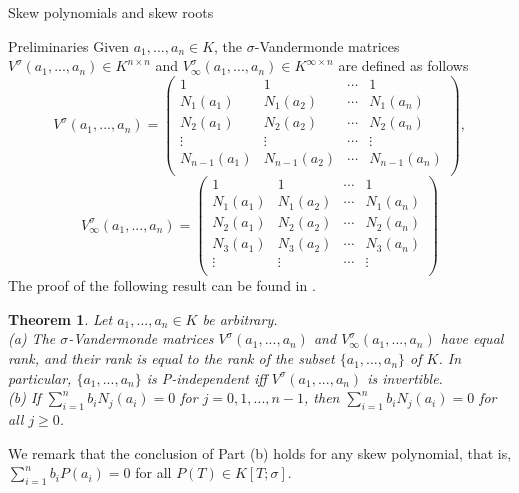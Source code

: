 \documentclass[11pt,a4paper]{article}
\theoremstyle{theorem}
\newtheorem{theorem}{Theorem}[section]
\numberwithin{equation}{section}
\newcommand{\s}{\sigma}
\begin{document}
\begin{section}{Skew polynomials and skew roots}
\begin{subsection}{Preliminaries}
	Given $a_1,...,a_n\in K$, the $\s$-Vandermonde matrices  $V^\s(a_1,...,a_n)\in K^{n\times n}$ and  $V^\s_{\infty}(a_1,...,a_n)\in K^{\infty\times n}$ are defined as follows
	$$
	V^\s(a_1,...,a_n)=\begin{pmatrix}
		1&1&\cdots&1\\
		N_{1}(a_1)&N_{1}(a_2)&\cdots&N_{1}(a_n)\\
		N_{2}(a_1)&N_{2}(a_2)&\cdots&N_{2}(a_n)\\
		\vdots&\vdots&\cdots&\vdots\\
		N_{n-1}(a_1)&N_{n-1}(a_2)&\cdots&N_{n-1}(a_n)\\
	\end{pmatrix},
	$$
	$$
	V^\s_{\infty}(a_1,...,a_n)=\begin{pmatrix}
		1&1&\cdots&1\\
		N_{1}(a_1)&N_{1}(a_2)&\cdots&N_{1}(a_n)\\
		N_{2}(a_1)&N_{2}(a_2)&\cdots&N_{2}(a_n)\\
		N_{3}(a_1)&N_{3}(a_2)&\cdots&N_{3}(a_n)\\
		\vdots&\vdots&\cdots&\vdots\\
	\end{pmatrix}
	$$
	The proof of the following result can be found in \cite{lam1985general}. 
	\begin{theorem}\label{(T)Vandermonde}
		Let $a_1,...,a_n\in K$ be arbitrary.\\
		(a) The $\s$-Vandermonde matrices $V^\s(a_1,...,a_n)$ and  $V^\s_{\infty}(a_1,...,a_n)$ have equal rank, and their rank is equal to the rank of the subset $\{a_1,...,a_n\}$ of $K$. In particular, $\{a_1,...,a_n\}$ is P-independent iff $V^\s(a_1,...,a_n)$ is invertible. \\
		(b) If $\sum_{i=1}^{n}b_iN_j(a_{i})=0$ for $j=0,1,...,n-1$, then $\sum_{i=1}^{n}b_iN_j(a_{i})=0$ for all $j\geq 0$. 
	\end{theorem}
	We remark that the conclusion of Part (b) holds for any skew polynomial, that is,   $\sum_{i=1}^{n}b_iP(a_{i})=0$ for all $P(T)\in K[T;\s]$. 
	

\end{subsection}
\end{section}
\end{document}
